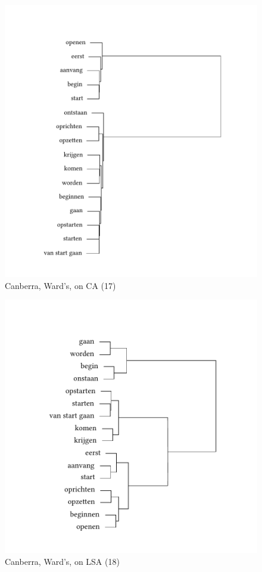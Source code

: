 \begin{figure}
\includegraphics[height=.4\textheight]{figures/tree46.pdf}
\caption{\label{fig:3:46}  Canberra, Ward’s, on CA (17)}
\end{figure}

\begin{figure}
\includegraphics[height=.4\textheight]{figures/tree47.pdf}
\caption{\label{fig:3:47}  Canberra, Ward’s, on LSA (18)}
\end{figure}

